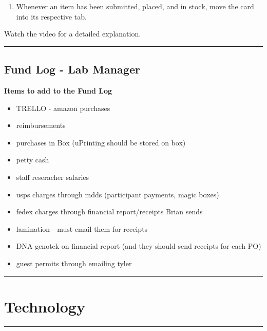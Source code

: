 \documentclass[
]{book}
\providecommand{\tightlist}{%
  \setlength{\itemsep}{0pt}\setlength{\parskip}{0pt}}
\begin{document}
\begin{enumerate}
\def\labelenumi{\arabic{enumi}.}
\setcounter{enumi}{5}
\tightlist
\item
  Whenever an item has been submitted, placed, and in stock, move the card into its respective tab.
\end{enumerate}

Watch the video for a detailed explanation.

\begin{center}\rule{0.5\linewidth}{0.5pt}\end{center}

\hypertarget{fund-log---lab-manager}{%
\subsection{Fund Log - Lab Manager}\label{fund-log---lab-manager}}

\textbf{Items to add to the Fund Log}

\begin{itemize}
\tightlist
\item
  TRELLO - amazon purchases
\item
  reimbursements
\item
  purchases in Box (uPrinting should be stored on box)
\item
  petty cash
\item
  staff reseracher salaries
\item
  usps charges through mdds (participant payments, magic boxes)
\item
  fedex charges through financial report/receipts Brian sends
\item
  lamination - must email them for receipts
\item
  DNA genotek on financial report (and they should send receipts for each PO)
\item
  guest permits through emailing tyler
\end{itemize}

\begin{center}\rule{0.5\linewidth}{0.5pt}\end{center}

\hypertarget{technology}{%
\section{Technology}\label{technology}}

\begin{center}\rule{0.5\linewidth}{0.5pt}\end{center}
\end{document}

